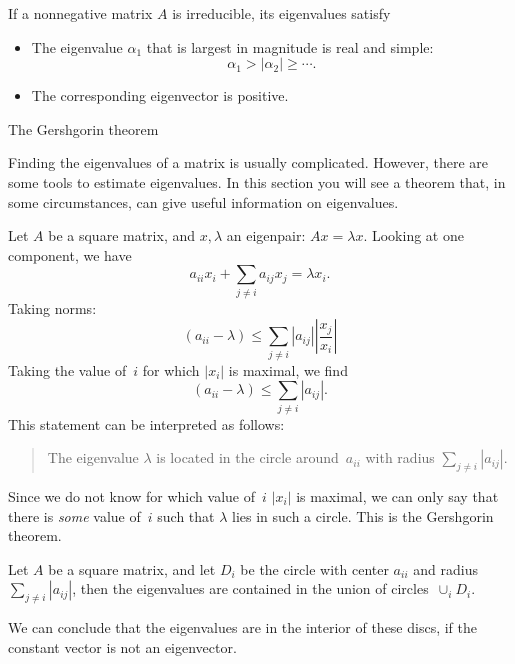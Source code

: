 \begin{theorem}
  If a nonnegative matrix $A$ is irreducible, its eigenvalues
  satisfy
  \begin{itemize}
  \item The eigenvalue $\alpha_1$ that is largest in magnitude is real
    and simple:
    \[ \alpha_1> |\alpha_2|\geq\cdots. \]
  \item The corresponding eigenvector is positive.
  \end{itemize}
\end{theorem}


 {The Gershgorin theorem}
\label{app:gershgorin}

Finding the eigenvalues of a matrix is usually complicated. However,
there are some tools to estimate eigenvalues. In this section you will
see a theorem that, in some circumstances, can give useful information
on eigenvalues.

Let $A$ be a square matrix, and $x,\lambda$ an eigenpair: $Ax=\lambda
x$. Looking at one component, we have
\[ a_{ii}x_i+\sum_{j\not=i} a_{ij}x_j=\lambda x_i. \]
Taking norms:
\[ (a_{ii}-\lambda) \leq \sum_{j\not=i} |a_{ij}|
   \left|\frac{x_j}{x_i}\right|
\]
Taking the value of~$i$ for which $|x_i|$ is maximal, we find
\[ (a_{ii}-\lambda) \leq \sum_{j\not=i} |a_{ij}|.
\]
This statement can be interpreted as follows: 
\begin{quotation}
  The eigenvalue $\lambda$ is located in the circle around~$a_{ii}$
  with radius $\sum_{j\not=i}|a_{ij}|$.
\end{quotation}
Since we do not know for which value of~$i$ $|x_i|$ is maximal, we can
only say that there is \emph{some} value of~$i$ such that $\lambda$
lies in such a circle. This is the Gershgorin theorem.

\begin{theorem}
  Let $A$ be a square matrix, and let $D_i$ be the circle with center
  $a_{ii}$ and radius $\sum_{j\not=i}|a_{ij}|$, then the eigenvalues
  are contained in the union of circles~$\cup_i D_i$.
\end{theorem}

We can conclude that the eigenvalues are in the interior of these
discs, if the constant vector is not an eigenvector.
